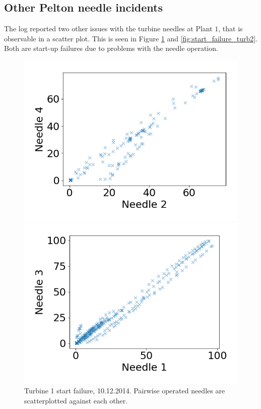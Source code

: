         
    \subsection{Other Pelton needle incidents}\label{subsec:start_failures}
        The log reported two other issues with the turbine needles at Plant $1$, that is observable in a scatter plot. This is seen in Figure \ref{fig:start_failure_turb1} and \ref{fig:start_failure_turb2}. Both are start-up failures due to problems with the needle operation.
        \begin{figure}[h!]
            \begin{minipage}[b]{0.49\linewidth}
                \centering
                \includegraphics[width = \textwidth]{report/figures/data/turb1_n2_n4_scatter_start_failure_10122014.png}
                \caption{Turbine 1 start failure, 10.12.2014. Pairwise operated needles are scatterplotted against each other.}
                \label{fig:start_failure_turb1}
            \end{minipage}
            \hfill\vline\hfill
            \begin{minipage}[b]{0.49\linewidth}
                \centering
                \includegraphics[width = \textwidth]{report/figures/data/turb2_n1_n3_start_failure_25082016.png}

\end{minipage}
\end{figure}
